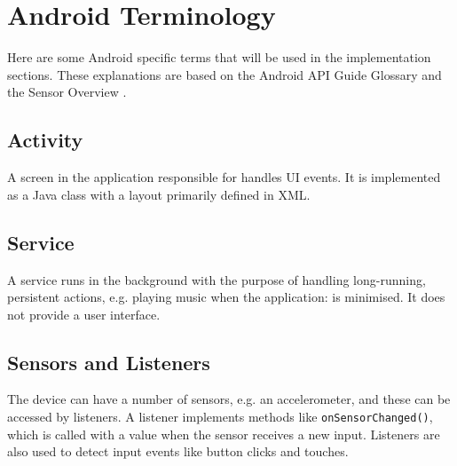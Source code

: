 \section{Android Terminology}
Here are some Android specific terms that will be used in the implementation sections. These explanations are based on the Android API Guide Glossary \citep{android:terms} and the Sensor Overview \citep{android:sensor}.

\subsection*{Activity}
A screen in the application responsible for handles UI events. It is implemented as a Java class with a layout primarily defined in XML.


\subsection*{Service}
A service runs in the background with the purpose of handling long-running, persistent actions, e.g. playing music when the application: is minimised. It does not provide a user interface. 

\subsection*{Sensors and Listeners}
The device can have a number of sensors, e.g. an accelerometer, and these can be accessed by listeners. A listener implements methods like \texttt{onSensorChanged()}, which is called with a value when the sensor receives a new input. Listeners are also used to detect input events like button clicks and touches.
